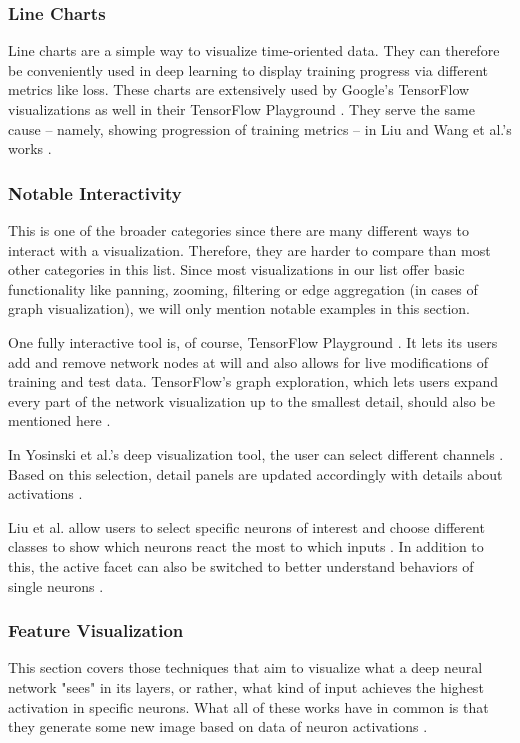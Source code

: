 \documentclass{acmsiggraph}               %
\begin{document}
\subsubsection{Line Charts}
Line charts are a simple way to visualize time-oriented data. They can therefore be conveniently used in deep learning to display training progress via different metrics like loss. These charts are extensively used by Google's TensorFlow visualizations as well in their TensorFlow Playground \cite{Wongsuphasawat2018,Smilkov2017}.
They serve the same cause -- namely, showing progression of training metrics -- in Liu and Wang et al.'s works \cite{Liu2018,Wang}.
\subsubsection{Notable Interactivity}
This is one of the broader categories since there are many different ways to interact with a visualization. Therefore, they are harder to compare than most other categories in this list. Since most visualizations in our list offer basic functionality like panning, zooming, filtering or edge aggregation (in cases of graph visualization), we will only mention notable examples in this section.

One fully interactive tool is, of course, TensorFlow Playground \cite{Smilkov2017}. It lets its users add and remove network nodes at will and also allows for live modifications of training and test data. TensorFlow's graph exploration, which lets users expand every part of the network visualization up to the smallest detail, should also be mentioned here \cite{Wongsuphasawat2018}.

In Yosinski et al.'s deep visualization tool, the user can select different channels \cite{Yosinski2015}. Based on this selection, detail panels are updated accordingly with details about activations \cite{Yosinski2015}.

Liu et al. allow users to select specific neurons of interest and choose different classes to show which neurons react the most to which inputs \cite{Liu2016}. In addition to this, the active facet can also be switched to better understand behaviors of single neurons \cite{Liu2016}.
\subsubsection{Feature Visualization}
This section covers those techniques that aim to visualize what a deep neural network "sees" in its layers, or rather, what kind of input achieves the highest activation in specific neurons. What all of these works have in common is that they generate some new image based on data of neuron activations \cite{Hohman2018}.
\end{document}
